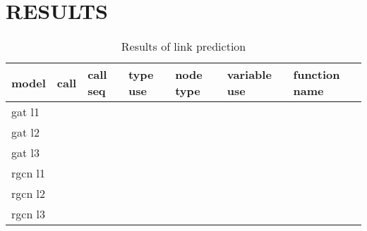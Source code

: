 \documentclass[a4paper,twoside]{article}
\begin{document}










\section{\uppercase{Results}}

\begin{table*}[]
\centering
\label{tbl:results}
\caption{Results of link prediction}
\begin{tabular}{lllllll}
model   & call & call seq & type use & node type & variable use & function name \\ \hline
gat l1  &      &          &          &           &              &               \\
gat l2  &      &          &          &           &              &               \\
gat l3  &      &          &          &           &              &               \\
rgcn l1 &      &          &          &           &              &               \\
rgcn l2 &      &          &          &           &              &               \\
rgcn l3 &      &          &          &           &              &              
\end{tabular}
\end{table*}



{\small
}
\end{document}
